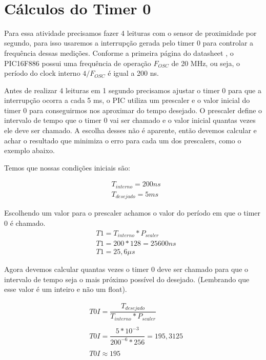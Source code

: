 \documentclass{article}
\begin{document}
\
\section{Cálculos do Timer 0}




Para essa atividade precisamos fazer 4 leituras com o sensor de proximidade por segundo, para isso usaremos a interrupção gerada pelo timer 0 para controlar a frequência dessas medições. Conforme a primeira página do datasheet \cite{PICDatasheet}, o PIC16F886 possui uma frequência de operação $F_{OSC}$ de 20 MHz, ou seja, o período do clock interno $4/F_{OSC}$ é igual a 200 ns.\par

Antes de realizar 4 leituras em 1 segundo precisamos ajustar o timer 0 para que a interrupção ocorra a cada 5 ms, o PIC utiliza um prescaler e o valor inicial do timer 0 para conseguirmos nos aproximar do tempo desejado.
O prescaler define o intervalo de tempo que o timer 0 vai ser chamado e o valor inicial quantas vezes ele deve ser chamado. A escolha desses não é aparente, então devemos calcular e achar o resultado que minimiza o erro para cada um dos prescalers, como o exemplo abaixo.\par

Temos que nossas condições iniciais são:

\begin{align*}
    &T_{interno} = 200 ns\\
    &T_{desejado} = 5 ms
\end{align*}

Escolhendo um valor para o prescaler achamos o valor do período em que o timer 0 é chamado.
\begin{align*}
   &T1 = T_{interno} * P_{scaler}\\
   &T1 = 200 * 128 = 25600 ns\\ 
   &T1=25,6\mu s
\end{align*}

Agora devemos calcular quantas vezes o timer 0 deve ser chamado para que o intervalo de tempo seja o mais próximo possível do desejado. (Lembrando que esse valor é um inteiro e não um float).

\begin{align*}
   &T0I = \dfrac{T_{desejado}}{T_{interno}* P_{scaler}}\\\\
   &T0I = \dfrac{5*10^{-3}}{200^{-6}*256} = 195,3125\\\\
   &T0I \approx 195
\end{align*}
\end{document}
